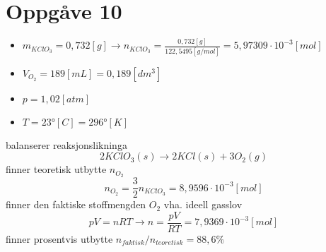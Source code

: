 \documentclass[12pt,a4paper]{article}
\begin{document}
  \section*{Oppgåve 10}
    \begin{itemize}
      \item $m_{KClO_3} = 0,732[g] \rightarrow
        n_{KClO_3} = \frac{0,732[g]}{122,5495[g/mol]} = 5,97309\cdot 10^{-3}[mol]$
      \item $V_{O_2} = 189[mL] = 0,189 [dm^3]$
      \item $p = 1,02 [atm]$
      \item $T = \ang{23}[C] = \ang{296}[K]$
    \end{itemize}
    balanserer reaksjonslikninga
    \begin{equation}
      2KClO_3(s) \longrightarrow 2KCl(s) + 3O_2(g)
    \end{equation}
    finner teoretisk utbytte $n_{O_2}$
    \begin{equation}
      n_{O_2} = \frac{3}{2}n_{KClO_3} = 8,9596\cdot10^{-3}[mol]
    \end{equation}
    finner den faktiske stoffmengden $O_2$ vha. ideell gasslov
    \begin{equation}
      pV=nRT \rightarrow n = \frac{pV}{RT} = 7,9369\cdot10^{-3}[mol]
    \end{equation}
    finner prosentvis utbytte $n_{faktisk}/n_{teoretisk} = 88,6\%$

    
\end{document}

